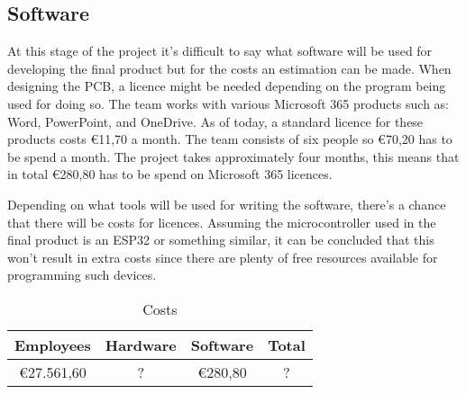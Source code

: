 \documentclass{article}
\begin{document}
\subsection*{Software}
At this stage of the project it's difficult to say what software will be used for developing the final product but for the costs an estimation can be made.
When designing the PCB, a licence might be needed depending on the program being used for doing so.
The team works with various Microsoft 365 products such as: Word, PowerPoint, and OneDrive.
As of today, a standard licence for these products costs \euro{}11,70 a month. 
The team consists of six people so \textup{\euro}70,20 has to be spend a month.
The project takes approximately four months, this means that in total \euro{}280,80 has to be spend on Microsoft 365 licences.

Depending on what tools will be used for writing the software, there's a chance that there will be costs for licences.
Assuming the microcontroller used in the final product is an ESP32 or something similar, it can be concluded that this won't result in extra costs since there are plenty of free resources available for programming such devices.

\begin{table}[htbp]
\centering
\caption{Costs}
\begin{tabular}{c|c|c|c}
Employees & Hardware & Software & Total \\
\hline
\euro{}27.561,60 & ? & \euro{}280,80 & ? \\
\end{tabular}
\end{table}
\end{document}
